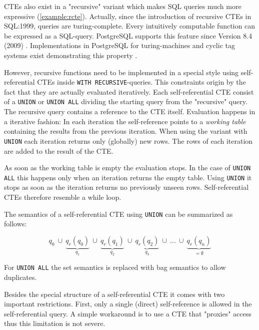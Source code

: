 CTEs also exist in a "recursive" variant which makes SQL queries much more expressive (\autoref{example:rcte}). Actually, since the introduction of recursive CTEs in SQL:1999, queries are turing-complete. Every intuitively computable function can be expressed as a SQL-query. PostgreSQL supports this feature since Version 8.4 (2009) \cite[p. 2811]{psql}. Implementations in PostgreSQL for turing-machines and cyclic tag systems exist demonstrating this property \cite{psqlWikiCTS, psqlWikiTM}.

However, recursive functions need to be implemented in a special style using self-referential CTEs inside \texttt{WITH RECURSIVE}-queries. This constraints origin by the fact that they are actually evaluated iteratively. Each self-referential CTE consist of a \texttt{UNION} or \texttt{UNION ALL} dividing the starting query from the "recursive" query. The recursive query contains a reference to the CTE itself. Evaluation happens in a iterative fashion: In each iteration the self-reference points to a \textit{working table} containing the results from the previous iteration. When using the variant with \texttt{UNION} each iteration returns only (globally) new rows. The rows of each iteration are added to the result of the CTE.

As soon as the working table is empty the evaluation stops. In the case of \texttt{UNION ALL} this happens only when an iteration returns the empty table. Using \texttt{UNION} it stops as soon as the iteration returns no previously unseen rows. Self-referential CTEs therefore resemble a while loop.

The semantics of a self-referential CTE using \texttt{UNION} can be summarized as follows:

$$
q_0 ~\cup ~\underbrace{q_r(q_0)}_{q_1} ~\cup~ \underbrace{q_r(q_1)}_{q_2}~ \cup~\underbrace{q_r(q_2)}_{q_3}~ \cup ~\hdots ~ \cup ~ \underbrace{q_r(q_n)}_{= \emptyset}
$$

For \texttt{UNION ALL} the set semantics is replaced with bag semantics to allow duplicates.

Besides the special structure of a self-referential CTE it comes with two important restrictions. First, only a single (direct) self-reference is allowed in the self-referential query. A simple workaround is to use a CTE that "proxies" access thus this limitation is not severe.

